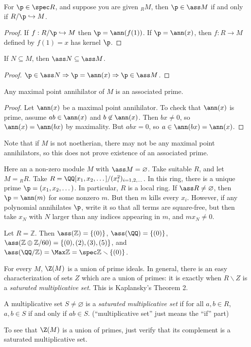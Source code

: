  \begin{lemma}
   For $\p\in \spec R$, and suppose you are given ${}_R M$, then $\p\in \ass M$ if and
   only if $R/\p\hookrightarrow M$.
 \end{lemma}
 \begin{proof}
   If $f:R/\p\hookrightarrow M$ then $\p = \ann (f(1))$. If $\p=\ann(x)$, then $f:R\to M$
   defined by $f(1)=x$ has kernel $\p$.
 \end{proof}
 \begin{lemma}\label{lec04L:assinclusion}
   If $N\subseteq M$, then $\ass N\subseteq \ass M$.
 \end{lemma}
 \begin{proof}
   $\p\in \ass N\Rightarrow \p=\ann(x)\Rightarrow \p\in \ass M$.
 \end{proof}
 \begin{lemma}[Herstein]
   Any maximal point annihilator of $M$ is an associated prime.
 \end{lemma}
 \begin{proof}
   Let $\ann(x)$ be a maximal point annihilator. To check that $\ann(x)$ is prime,
   assume $ab\in \ann(x)$ and $b\not\in \ann(x)$. Then $bx\neq 0$, so $\ann(x)=
   \ann(bx)$ by maximality. But $abx=0$, so $a\in \ann(bx)=\ann(x)$.
 \end{proof}
   Note that if $M$ is not noetherian, there may not be any maximal point annihilators, so
   this does not prove existence of an associated prime.
 \begin{example}
   Here an a non-zero module $M$ with $\ass M=\varnothing$. Take suitable $R$, and let
   $M = {}_R R$. Take $R = \QQ[x_1,x_2,\dots]/(x_i^2)_{i=1,2,\dots}$. In this ring,
   there is a unique prime $\p = (x_1,x_2,\dots)$. In particular, $R$ is a local ring.
   If $\ass R\neq \varnothing$, then $\p=\ann (m)$ for some nonzero $m$. But then $m$
   kills every $x_i$. However, if any polynomial annihilates $\p$, write it so that all
   terms are square-free, but then take $x_N$ with $N$ larger than any indices appearing
   in $m$, and $mx_N\neq 0$.
 \end{example}
 \begin{example}
    Let $R=\mathbb{Z}$. Then $\ass(\mathbb{Z}) = \{(0)\}$, $\ass(\QQ) = \{(0)\}$, $\ass(\mathbb{Z}\oplus
    \mathbb{Z}/60)=\{(0),(2),(3),(5)\}$, and $\ass(\QQ/\mathbb{Z})=\Max \mathbb{Z} = \spec \mathbb{Z}\smallsetminus
    \{(0)\}$.
 \end{example}
 For every $M$, $\Z(M)$ is a union of prime ideals. In general, there is an easy
 characterization of sets $Z$ which are a union of primes: it is exactly when
 $R\smallsetminus Z$ is a \emph{saturated multiplicative set}. This is Kaplansky's
 Theorem 2.
 \begin{definition}
   A multiplicative set $S\neq \varnothing$ is a \emph{saturated multiplicative set} if
   for all $a,b\in R$, $a,b\in S$ if and only if $ab\in S$. (``multiplicative set'' just
   means the ``if'' part)
 \end{definition}
 To see that $\Z(M)$ is a union of primes, just verify that its complement is a saturated
 multiplicative set.

